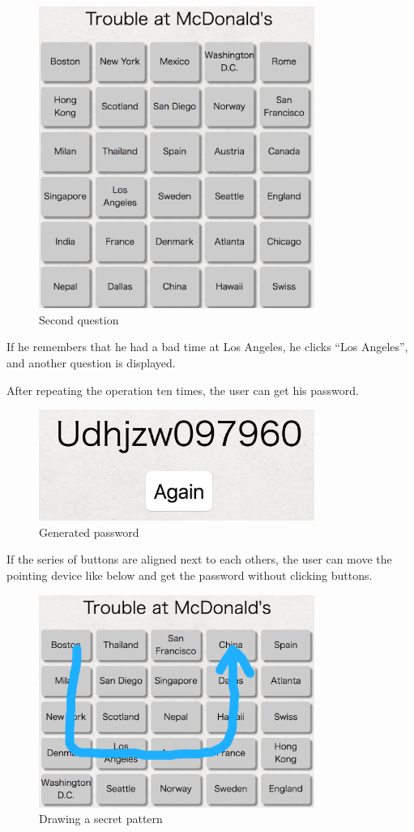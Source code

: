\documentclass[sigconf]{acmart}
\begin{document}
\begin{figure}
  \includegraphics[width=9cm,bb=0 0 1130 1236]{figures/EpisoDAS1.png}
  \caption{Second question}
  \label{EpisoDAS2}
\end{figure}

If he remembers that he had a bad time at Los Angeles,
he clicks ``Los Angeles'', and another question is displayed.

After repeating the operation ten times,
the user can get his password.

\begin{figure}
  \includegraphics[width=9cm,bb=0 0 1160 468]{figures/result.png}
  \caption{Generated password}
  \label{EpisoDAS2}
\end{figure}

If the series of buttons are aligned next to each others,
the user can move the pointing device like below and get the password
without clicking buttons.

\begin{figure}
  \includegraphics[width=9cm,bb=0 0 1130 1236]{figures/draw.png}
  \caption{Drawing a secret pattern}
  \label{EpisoDAS2}
\end{figure}
\end{document}
